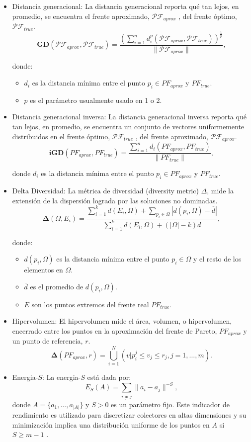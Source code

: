 \documentclass[letterpaper,10pt]{article}
\begin{document}
\begin{itemize}
 \item Distancia generacional: La distancia generacional reporta qué tan lejos, en promedio, se encuentra el frente aproximado, $\mathcal{PF}_{aprox}$ , del frente óptimo, $\mathcal{PF}_{true}$.
 $$\bm{GD}(\mathcal{PF}_{aprox},\mathcal{PF}_{true})=\frac{(\sum^n_{i=1} d_i^p(\mathcal{PF}_{aprox},\mathcal{PF}_{true}))^{\frac{1}{p}}}{\|\mathcal{PF}_{aprox}\|},$$
 
 donde:
 \begin{itemize}
  \item $d_i$ es la distancia mínima entre el punto $p_i \in PF_{aprox}$ y $PF_{true}$.
  \item $p$ es el parámetro usualmente usado en 1 o 2.
 \end{itemize}
 
 
 \item Distancia generacional inversa: La distancia generacional inversa reporta qué tan lejos, en promedio, se encuentra un conjunto de vectores uniformemente distribuidos en el frente óptimo, $\mathcal{PF}_{true}$ , del frente aproximado, $\mathcal{PF}_{aprox}$.
 $$\bm{iGD}(PF_{aprox},PF_{true})=\frac{\sum^n_{i=1} d_i(PF_{aprox},PF_{true})}{\|PF_{true}\|},$$
 
donde $d_i$ es la distancia mínima entre el punto $p_i \in PF_{aprox}$ y $PF_{true}$.


 \item Delta Diversidad: La métrica de diversidad (diversity metric) $\Delta$, mide la extensión de la dispersión lograda por las soluciones no dominadas.
 $$\bm{\Delta}(\Omega,E_i)=\frac{\sum^k_{i=1} d(E_i,\Omega) + \sum_{p_i \in \Omega} |d(p_i,\Omega)-\overline{d}|}{\sum^k_{i=1} d(E_i,\Omega) + (|\Omega| - k)\overline{d}},$$
 
 donde:
 \begin{itemize}
  \item $d(p_i,\Omega)$ es la distancia mínima entre el punto $p_i \in \Omega$ y el resto de los elementos en $\Omega$.
  \item $\overline{d}$ es el promedio de $d(p_i,\Omega)$.
  \item $E$ son los puntos extremos del frente real $PF_{true}$.
 \end{itemize}

 \item Hipervolumen: El hipervolumen mide el área, volumen, o hipervolumen, encerrado entre los puntos en la aproximación del frente de Pareto, $PF_{aprox}$ y un punto de referencia, $r$.
 $$\bm{\Delta}(PF_{aprox},r)=\bigcup^N_{i=1} (v|p^j_i \leq v_j \leq r_j , j = 1, \dots, m).$$
 
 \item Energia-$S$: La energia-$S$ está dada por:
 $$E_S(A)= \sum_{i\neq j}\| a_i - a_j\|^{-S},$$
 donde $A = \{ a_1, \dots, a_{|A|}\}$ y $S>0$ es un parámetro fijo. Este indicador de rendimiento es utilizado para discretizar colectores en altas dimensiones y
 su minimización implica una distribución uniforme de los puntos en $A$ si $S\geq m-1$ \cite{hardin2004discretizing}.
\end{itemize}
\end{document}
